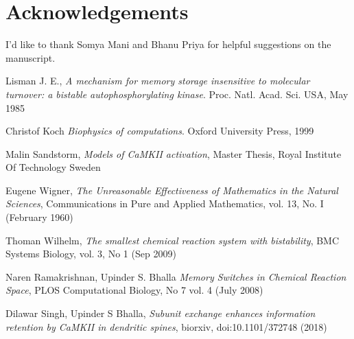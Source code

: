 \documentclass[]{resonance}
\begin{document}
\section*{Acknowledgements} I'd like to thank Somya Mani and Bhanu Priya for
helpful suggestions on the manuscript.


\begin{thebibliography}{99} 
    Lisman J. E., 
    \textit{A mechanism for memory storage insensitive to molecular turnover: a
    bistable autophosphorylating kinase}. 
    Proc. Natl. Acad. Sci. USA, May 1985

    Christof Koch
    \textit{Biophysics of computations}.
    Oxford University Press, 1999

    Malin Sandstorm,
    \textit{Models of CaMKII activation},
    Master Thesis, Royal Institute Of Technology Sweden 

    Eugene Wigner,
    \textit{The Unreasonable Effectiveness of Mathematics in the Natural Sciences},
     Communications in Pure and Applied Mathematics, vol. 13, No. I (February 1960)

    Thoman Wilhelm,
    \textit{The smallest chemical reaction system with bistability},
    BMC Systems Biology, vol. 3, No 1 (Sep 2009)

    Naren Ramakrishnan, Upinder S. Bhalla
    \textit{Memory Switches in Chemical Reaction Space},
    PLOS Computational Biology, No 7 vol. 4 (July 2008)

    Dilawar Singh, Upinder S Bhalla,
    \textit{Subunit exchange enhances information retention by CaMKII in dendritic spines},
    biorxiv, doi:10.1101/372748 (2018)

\end{thebibliography}
\end{document}
